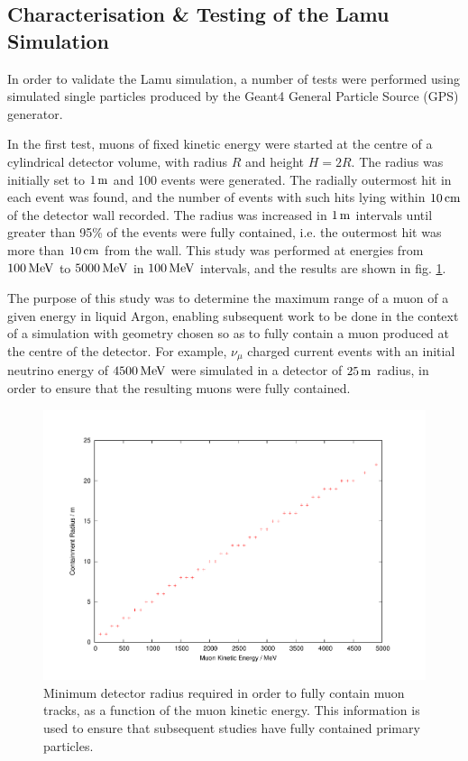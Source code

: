\subsection{Characterisation \& Testing of the Lamu Simulation}
In order to validate the Lamu simulation, a number of tests were performed using simulated single particles produced by the Geant4 General Particle Source (GPS) generator\citep{GeantGPS}.

In the first test, muons of fixed kinetic energy were started at the centre of a cylindrical detector volume, with radius $R$ and height $H=2R$. The radius was initially set to $1\metre$ and 100 events were generated. The radially outermost hit in each event was found, and the number of events with such hits lying within $10\cm$ of the detector wall recorded. The radius was increased in $1\metre$ intervals until greater than 95\% of the events were fully contained, i.e. the outermost hit was more than $10\cm$ from the wall. This study was performed at energies from $100\MeV$ to $5000\MeV$ in $100\MeV$ intervals, and the results are shown in fig. \ref{fig:lamu-containment-radius}.

The purpose of this study was to determine the maximum range of a muon of a given energy in liquid Argon, enabling subsequent work to be done in the context of a simulation with geometry chosen so as to fully contain a muon produced at the centre of the detector. For example, $\nu_\mu$ charged current events with an initial neutrino energy of $4500\MeV$ were simulated in a detector of $25\metre$ radius, in order to ensure that the resulting muons were fully contained.

\begin{figure}
\includegraphics[angle=-90,width=\textwidth]{chapters/detectorphysics_images/containment_radius}
\caption[Detector radius required for full containment as a function of energy]{\label{fig:lamu-containment-radius}Minimum detector radius required in order to fully contain muon tracks, as a function of the muon kinetic energy. This information is used to ensure that subsequent studies have fully contained primary particles.}
\end{figure}

